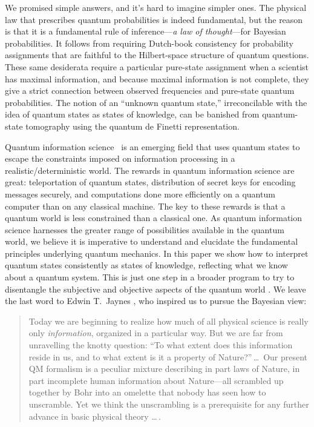 \documentclass[aps,12pt]{revtex4}
\begin{document}
We promised simple answers, and it's hard to imagine simpler ones.
The physical law that prescribes quantum probabilities is indeed
fundamental, but the reason is that it is a fundamental rule of
inference---{\it a law of thought}---for Bayesian probabilities.  It
follows from requiring Dutch-book consistency for probability
assignments that are faithful to the Hilbert-space structure of
quantum questions.  These same desiderata require a particular
pure-state assignment when a scientist has maximal information, and
because maximal information is not complete, they give a strict
connection between observed frequencies and pure-state quantum
probabilities.  The notion of an ``unknown quantum state,''
irreconcilable with the idea of quantum states as states of
knowledge, can be banished from quantum-state tomography using the
quantum de Finetti representation.

Quantum information science~\cite{NatureReview} is an emerging field
that uses quantum states to escape the constraints imposed on
information processing in a realistic/determin\-is\-tic world.  The
rewards in quantum information science are great: teleportation of
quantum states, distribution of secret keys for encoding messages
securely, and computations done more efficiently on a quantum
computer than on any classical machine.  The key to these rewards is
that a quantum world is less constrained than a classical one.  As
quantum information science harnesses the greater range of
possibilities available in the quantum world, we believe it is
imperative to understand and elucidate the fundamental principles
underlying quantum mechanics. In this paper we show how to interpret
quantum states consistently as states of knowledge, reflecting what
we know about a quantum system.  This is just one step in a broader
program to try to disentangle the subjective and objective aspects of
the quantum world \cite{Fuchs01}.  We leave the last word to Edwin
T.~Jaynes \cite{Jaynes1990a}, who inspired us to pursue the Bayesian
view:

\begin{quotation}
Today we are beginning to realize how much of all physical science is
really only {\it information}, organized in a particular way.  But we
are far from unravelling the knotty question: ``To what extent does
this information reside in us, and to what extent is it a property of
Nature?''\,\dots\ Our present QM formalism is a peculiar mixture
describing in part laws of Nature, in part incomplete human
information about Nature---all scrambled up together by Bohr into an
omelette that nobody has seen how to unscramble.  Yet we think the
unscrambling is a prerequisite for any further advance in basic
physical theory \dots\,.
\end{quotation}
\end{document}
